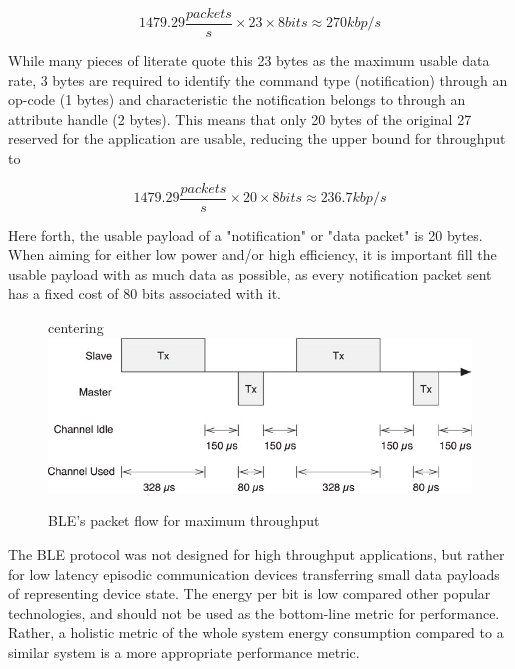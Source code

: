 \documentclass[]{article}
\begin{document}
\begin{displaymath}
1479.29 \frac{packets}{s} \times 23 \times 8 bits \approx 270 kbp/s
\end{displaymath}

While many pieces of literate quote this 23 bytes as the maximum usable data rate, 3 bytes are required to identify the command type (notification) through an op-code (1 bytes) and  characteristic the notification belongs to through an attribute handle (2 bytes). This means that only 20 bytes of the original 27 reserved for the application are usable, reducing the upper bound for throughput to 

\begin{displaymath}
1479.29 \frac{packets}{s} \times 20 \times 8 bits \approx 236.7 kbp/s
\end{displaymath}

Here forth, the usable payload of a "notification" or "data packet" is 20 bytes. When aiming for either low power and/or high efficiency, it is important fill the usable payload with as much data as possible, as every notification packet sent has a fixed cost of 80 bits associated with it.  

\begin{figure}[h]
	centering
		\includegraphics[width = 1\textwidth]{turnaround}
	\caption{\ac{BLE}'s packet flow for maximum throughput}
	\label{fig:turnaround}
\end{figure}

The \ac{BLE} protocol was not designed for high throughput applications, but rather for low latency episodic communication devices transferring small data payloads of representing device state. The energy per bit is low compared other popular technologies, and should not be used as the bottom-line metric for performance. Rather, a holistic metric of the whole system energy consumption compared to a similar system is a more appropriate performance metric.
\end{document}
